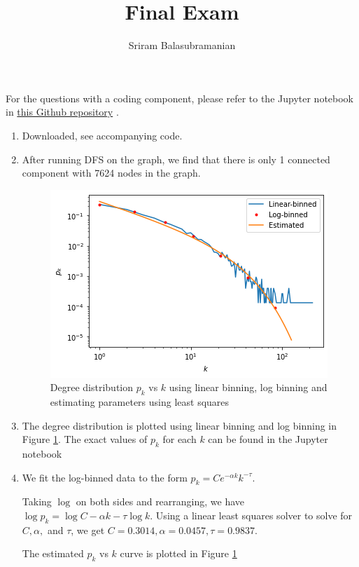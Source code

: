 \documentclass{article}
\title{\textbf{Final Exam}}
\author{Sriram Balasubramanian}
\begin{document}
 \maketitle

For the questions with a coding component, please refer to the Jupyter notebook in \href{https://github.com/SriramB-98/CMSC828V-projects/tree/main/FinalExam}{this Github repository}
. 


\begin{enumerate}


\item Downloaded, see accompanying code.

\item After running DFS on the graph, we find that there is only 1 connected component with 7624 nodes in the graph. 

\begin{figure}
\centering
\includegraphics[scale=0.5]{pk_vs_k.png}
\caption{Degree distribution $p_k$ vs $k$ using linear binning, log binning and estimating parameters using least squares}
\label{fig:pk_vs_k}
\end{figure}

\item The degree distribution is plotted using linear binning and log binning in Figure \ref{fig:pk_vs_k}. The exact values of $p_k$ for each $k$ can be found in the Jupyter notebook

\item We fit the log-binned data to the form $p_k = Ce^{-\alpha k}k^{-\tau}$.

  Taking $\log$ on both sides and rearranging, we have $\log p_k = \log C -\alpha k -\tau \log k$. Using a linear least squares solver to solve for $C, \alpha, $ and $\tau$, we get $C = 0.3014, \alpha=0.0457, \tau = 0.9837$.
  
  The estimated $p_k$ vs $k$ curve is plotted in Figure \ref{fig:pk_vs_k}


\end{enumerate}
\end{document}
